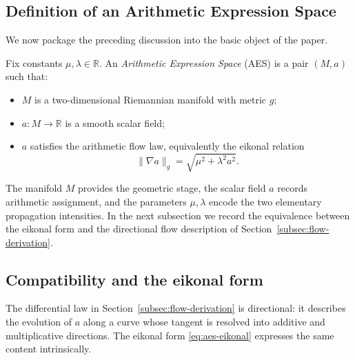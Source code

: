 
\subsection{Definition of an Arithmetic Expression Space}\label{subsec:aes-definition}

We now package the preceding discussion into the basic object of the paper.

\begin{definition}\label{def:aes}
Fix constants $\mu,\lambda\in\mathbb{R}$. An \emph{Arithmetic Expression Space} (AES) is a pair $(M,a)$ such that:
\begin{itemize}
    \item $M$ is a two-dimensional Riemannian manifold with metric $g$;
    \item $a:M\to\mathbb{R}$ is a smooth scalar field;
    \item $a$ satisfies the arithmetic flow law, equivalently the eikonal relation
    \begin{equation}\label{eq:aes-eikonal}
        \|\nabla a\|_g = \sqrt{\mu^2+\lambda^2 a^2}.
    \end{equation}
\end{itemize}
\end{definition}

The manifold $M$ provides the geometric stage, the scalar field $a$ records arithmetic assignment, and the parameters $\mu,\lambda$ encode the two elementary propagation intensities. In the next subsection we record the equivalence between the eikonal form and the directional flow description of Section~\ref{subsec:flow-derivation}.

\subsection{Compatibility and the eikonal form}\label{subsec:aes-eikonal}

The differential law in Section~\ref{subsec:flow-derivation} is directional: it describes the evolution of $a$ along a curve whose tangent is resolved into additive and multiplicative directions. The eikonal form \eqref{eq:aes-eikonal} expresses the same content intrinsically.

